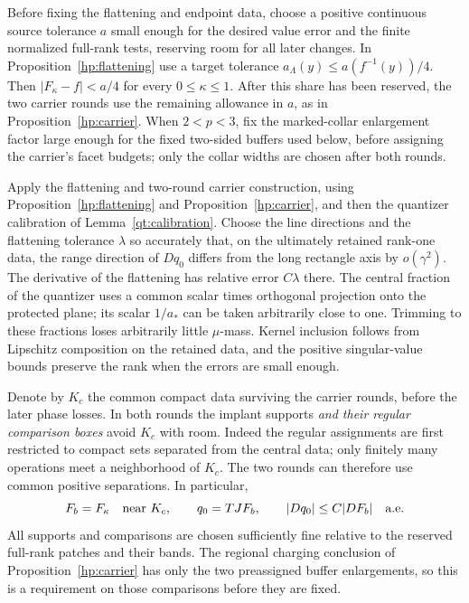 \documentclass[11pt]{article}
\numberwithin{equation}{section}
\theoremstyle{definition}
\theoremstyle{remark}
\begin{document}
Before fixing the flattening and endpoint data, choose a positive
continuous source tolerance $a$ small enough for the desired value
error and the finite normalized full-rank tests, reserving room for
all later changes.  In Proposition~\ref{hp:flattening} use a target
tolerance $a_\Lambda(y)\le a(f^{-1}(y))/4$.  Then
$|F_\kappa-f|<a/4$ for every $0\le\kappa\le1$.  After this share
has been reserved, the two carrier rounds use the remaining
allowance in $a$, as in Proposition~\ref{hp:carrier}.
When $2<p<3$, fix the marked-collar enlargement factor large enough
for the fixed two-sided buffers used below, before assigning the
carrier's facet budgets; only the collar widths are chosen after
both rounds.

Apply the flattening and two-round carrier construction, using
Proposition~\ref{hp:flattening} and Proposition~\ref{hp:carrier}, and then
the quantizer calibration of Lemma~\ref{qt:calibration}.
Choose the line directions and the flattening tolerance $\lambda$
so accurately that, on the ultimately retained rank-one data, the
range direction of $Dq_0$ differs from the long rectangle axis by
$o(\gamma^2)$.  The derivative of the flattening has relative error
$C\lambda$ there.  The central fraction of the quantizer uses a common
scalar times orthogonal projection onto the protected plane; its
scalar $1/a_*$ can be taken arbitrarily close to one.  Trimming to
these fractions loses arbitrarily little $\mu$-mass.  Kernel inclusion
follows from Lipschitz composition on the retained data, and the
positive singular-value bounds preserve the rank when the errors are
small enough.

Denote by $K_c$ the common compact data surviving the carrier rounds,
before the later phase losses.  In both rounds the implant supports
\emph{and their regular comparison boxes} avoid $K_c$ with room.
Indeed the regular assignments are first restricted to compact sets
separated from the central data; only finitely many operations meet
a neighborhood of $K_c$.  The two rounds can therefore use common
positive separations.  In particular,
\begin{equation}\label{ha:q0-weak}
 F_b=F_\kappa\quad\hbox{near }K_c,
 \qquad q_0=TJF_b,
 \qquad |Dq_0|\le C|DF_b|\quad\hbox{a.e.}
\end{equation}
All supports and comparisons are chosen sufficiently fine relative
to the reserved full-rank patches and their bands.  The regional
charging conclusion of Proposition~\ref{hp:carrier} has only the two
preassigned buffer enlargements, so this is a requirement on those
comparisons before they are fixed.
\end{document}
